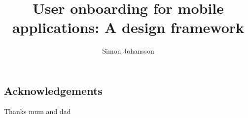 \documentclass[a4paper,11pt,twoside]{report}
\title{User onboarding for mobile applications: A design framework}
\author{Simon Johansson}
\begin{document}
\maketitle


\begin{center}
\section*{Acknowledgements}
Thanks mum and dad 
\end{center}

\clearpage

\end{document}
